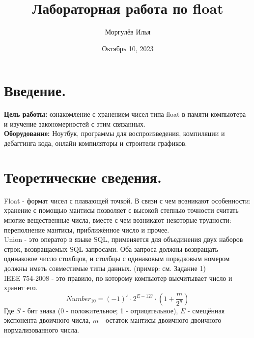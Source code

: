 \documentclass[a4paper, 12pt]{article}
\title{\textbf{Лабораторная работа по float}}
\author{Моргулёв Илья}
\date{Октябрь 10, 2023}
\begin{document}
    \maketitle

    \section{Введение.}

    \textbf{Цель работы:} ознакомление с хранением чисел типа float в памяти компьютера и изучение закономерностей с этим связанных.
    \bigskip\\
    \textbf{Оборудование:} Ноутбук, программы для воспроизведения, компиляции и дебаггинга кода, онлайн компиляторы и строители графиков.

    \section{Теоретические сведения.}
        Float - формат чисел с плавающей точкой. В связи с чем возникают особенности: хранение с помощью мантисы позволяет с высокой степнью точности считать многие вещественные числа, вместе с чем возникают некоторые трудности: переполнение мантисы, приближённое число и прочее.
        \[\]
        Union - это оператор в языке SQL, применяется для объединения двух наборов строк, возвращаемых SQL-запросами. Оба запроса должны возвращать одинаковое число столбцов, и столбцы с одинаковым порядковым номером должны иметь совместимые типы данных. (пример: см. Задание 1)
        \[\]
        IEEE 754-2008 - это правило, по которому компьютер высчитывает число и хранит его. 
        \[
        Number_{10} = (-1)^s \cdot 2^{E-127} \cdot (1+\frac{m}{2^n})
        \] Где $S$ - бит знака (0 - положительное; 1 - отрицательное), $E$ - смещённая экспонента двоичного числа, $m$ - остаток мантисы двоичного двоичного нормализованного числа.
\end{document}

